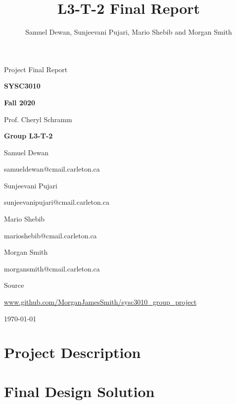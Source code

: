 \documentclass[11pt,letterpaper]{article}
\title{L3-T-2 Final Report}
\author{Samuel Dewan, Sunjeevani Pujari, Mario Shebib and Morgan Smith}
\let\Oldsection\section
\renewcommand{\section}{\FloatBarrier\Oldsection}
\begin{document}
\frenchspacing

\begin{titlepage}
\centering


{\Huge \sffamily Project Final Report}

{\large \textbf{SYSC3010}}

{\large \textbf{Fall 2020}}

Prof. Cheryl Schramm


{\large \textbf{Group L3-T-2}}

Samuel Dewan

{\footnotesize samueldewan@cmail.carleton.ca}

Sunjeevani Pujari

{\footnotesize sunjeevanipujari@cmail.carleton.ca}

Mario Shebib

{\footnotesize marioshebib@cmail.carleton.ca}

Morgan Smith

{\footnotesize morgansmith@cmail.carleton.ca}


Source

{\footnotesize \url{www.github.com/MorganJamesSmith/sysc3010\_group\_project}}


{\large \today}


\end{titlepage}

\tableofcontents
\clearpage
{}

\section{Project Description}
\label{sec:project-description}

\clearpage

\section{Final Design Solution}
\label{sec:final-design-solution}

\clearpage
\end{document}
